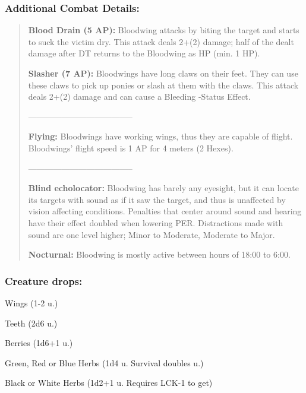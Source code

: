 \documentclass[11pt,a4paper,twocolumn]{book}
\begin{document}
	\subsubsection*{Additional Combat Details:}
	\begin{verse}
		
		\textbf{Blood Drain (5 AP):} Bloodwing attacks by biting the target and starts to suck the victim dry. This attack deals 2+(2) damage; half of the dealt damage  after DT returns to the Bloodwing as HP (min. 1 HP).
		
		\textbf{Slasher (7 AP):} Bloodwings have long claws on their feet. They can use these claws to pick up ponies or slash at them with the claws. This attack deals 2+(2) damage and can cause a Bleeding -Status Effect.
		
	--------------------------------------		
		
		\textbf{Flying:} Bloodwings have working wings, thus they are capable of flight. Bloodwings' flight speed is 1 AP for 4 meters (2 Hexes).
		
	--------------------------------------		
		
		\textbf{Blind echolocator:} Bloodwing has barely any eyesight, but it can locate its targets with sound as if it saw the target, and thus is unaffected by vision affecting conditions. Penalties that center around sound and hearing have their effect doubled when lowering PER. Distractions made with sound are one level higher; Minor to Moderate, Moderate to Major.
		
		\textbf{Nocturnal:} Bloodwing is mostly active between hours of 18:00 to 6:00.
		
%		
	\end{verse}
	
	\subsubsection*{Creature drops:}
	\begin{compactitem}
		\item Wings (1-2 u.)
		\item Teeth (2d6 u.)
		\item Berries (1d6+1 u.)
		\item Green, Red or Blue Herbs (1d4 u. Survival doubles u.)
		\item Black or White Herbs (1d2+1 u. Requires LCK-1 to get)
	\end{compactitem}
	
\end{document}
